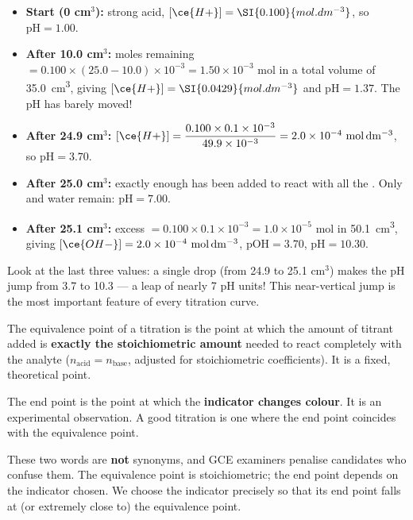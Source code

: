 \documentclass[11pt]{article}
\newcommand{\cle}[1]{{\popxbold\color{popdark}#1}}
\begin{document}
\begin{itemize}
\item \textbf{Start (0 cm$^3$):} strong acid, $[\ce{H+}] = \SI{0.100}{mol.dm^{-3}}$, so $\mathrm{pH} = 1.00$.
\item \textbf{After 10.0 cm$^3$:} moles  remaining $= 0.100\times(25.0-10.0)\times10^{-3} = 1.50\times10^{-3}$ mol in a total volume of \SI{35.0}{cm^3}, giving $[\ce{H+}] = \SI{0.0429}{mol.dm^{-3}}$ and $\mathrm{pH} = 1.37$. The pH has barely moved!
\item \textbf{After 24.9 cm$^3$:} $[\ce{H+}] = \dfrac{0.100\times0.1\times10^{-3}}{49.9\times10^{-3}} = 2.0\times10^{-4}\ \mathrm{mol\,dm^{-3}}$, so $\mathrm{pH} = 3.70$.
\item \textbf{After 25.0 cm$^3$:} exactly enough  has been added to react with all the . Only  and water remain: $\mathrm{pH} = 7.00$.
\item \textbf{After 25.1 cm$^3$:} excess  $= 0.100\times0.1\times10^{-3} = 1.0\times10^{-5}$ mol in \SI{50.1}{cm^3}, giving $[\ce{OH-}] = 2.0\times10^{-4}\ \mathrm{mol\,dm^{-3}}$, $\mathrm{pOH} = 3.70$, $\mathrm{pH} = 10.30$.
\end{itemize}

Look at the last three values: a single drop (from 24.9 to 25.1 cm$^3$) makes the pH jump from 3.7 to 10.3 — a leap of nearly 7 pH units! This near-vertical jump is the most important feature of every titration curve.

\begin{definition}
The \cle{equivalence point} of a titration is the point at which the amount of titrant added is \textbf{exactly the stoichiometric amount} needed to react completely with the analyte ($n_{\text{acid}} = n_{\text{base}}$, adjusted for stoichiometric coefficients). It is a fixed, theoretical point.

The \cle{end point} is the point at which the \textbf{indicator changes colour}. It is an experimental observation. A good titration is one where the end point coincides with the equivalence point.
\end{definition}

\begin{attention}
These two words are \textbf{not} synonyms, and GCE examiners penalise candidates who confuse them. The equivalence point is stoichiometric; the end point depends on the indicator chosen. We choose the indicator precisely so that its end point falls at (or extremely close to) the equivalence point.
\end{attention}
\end{document}
